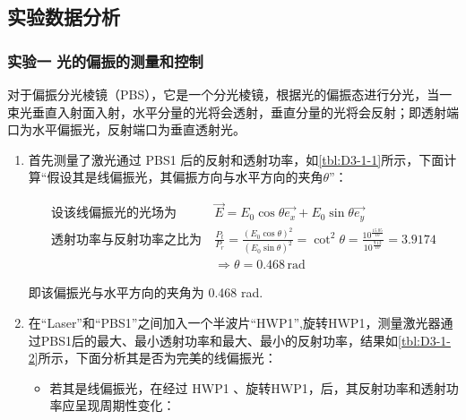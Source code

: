 \documentclass[dvipsnames, svgnames,a4paper,11pt]{article}
\begin{document}
\subsection{实验数据分析}


	\subsubsection{实验一 \quad 光的偏振的测量和控制}

		对于偏振分光棱镜（PBS），它是一个分光棱镜，根据光的偏振态进行分光，当一束光垂直入射面入射，水平分量的光将会透射，垂直分量的光将会反射；即透射端口为水平偏振光，反射端口为垂直透射光。
		
		\begin{enumerate}
			\item 首先测量了激光通过 PBS1 后的反射和透射功率，如\cref{tbl:D3-1-1}所示，下面计算“假设其是线偏振光，其偏振方向与水平方向的夹角$\theta$”：

				\begin{align}
					\text{设该线偏振光的光场为} \ & \vec{E} = E_0 \cos\theta \vec{e_x} + E_0 \sin\theta \vec{e_y} \nonumber \\
					\text{透射功率与反射功率之比为} \ & \frac{P_t}{P_r} = \frac{(E_0 \cos\theta)^2}{(E_0 \sin\theta)^2} = \cot^2\theta = \frac{10^{\frac{15.05}{10}}}{10^{\frac{9.12}{10}}} = 3.9174 \nonumber \\
					& \Rightarrow \theta = 0.468 \, \mathrm{rad} \nonumber
				\end{align}

			即该偏振光与水平方向的夹角为 0.468 rad.

			\item 在“Laser”和“PBS1”之间加入一个半波片“HWP1”,旋转HWP1，测量激光器通过PBS1后的最大、最小透射功率和最大、最小的反射功率，结果如\cref{tbl:D3-1-2}所示，下面分析其是否为完美的线偏振光：
				\begin{itemize}
					\item 若其是线偏振光，在经过 HWP1 、旋转HWP1，后，其反射功率和透射功率应呈现周期性变化：
					

\end{itemize}
\end{enumerate}
\end{document}
